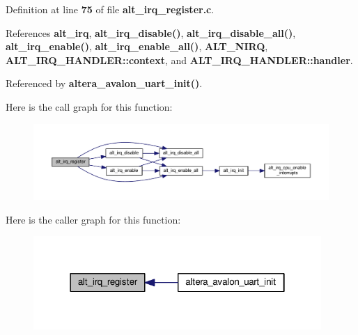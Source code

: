 Definition at line {\bf 75} of file {\bf alt\+\_\+irq\+\_\+register.\+c}.



References {\bf alt\+\_\+irq}, {\bf alt\+\_\+irq\+\_\+disable()}, {\bf alt\+\_\+irq\+\_\+disable\+\_\+all()}, {\bf alt\+\_\+irq\+\_\+enable()}, {\bf alt\+\_\+irq\+\_\+enable\+\_\+all()}, {\bf A\+L\+T\+\_\+\+N\+I\+RQ}, {\bf A\+L\+T\+\_\+\+I\+R\+Q\+\_\+\+H\+A\+N\+D\+L\+E\+R\+::context}, and {\bf A\+L\+T\+\_\+\+I\+R\+Q\+\_\+\+H\+A\+N\+D\+L\+E\+R\+::handler}.



Referenced by {\bf altera\+\_\+avalon\+\_\+uart\+\_\+init()}.



Here is the call graph for this function\+:
\nopagebreak
\begin{figure}[H]
\begin{center}
\leavevmode
\includegraphics[width=350pt]{d8/d51/alt__legacy__irq_8h_a4c1559221c7978160da19c389d055f90_cgraph}
\end{center}
\end{figure}




Here is the caller graph for this function\+:
\nopagebreak
\begin{figure}[H]
\begin{center}
\leavevmode
\includegraphics[width=310pt]{d8/d51/alt__legacy__irq_8h_a4c1559221c7978160da19c389d055f90_icgraph}
\end{center}
\end{figure}


